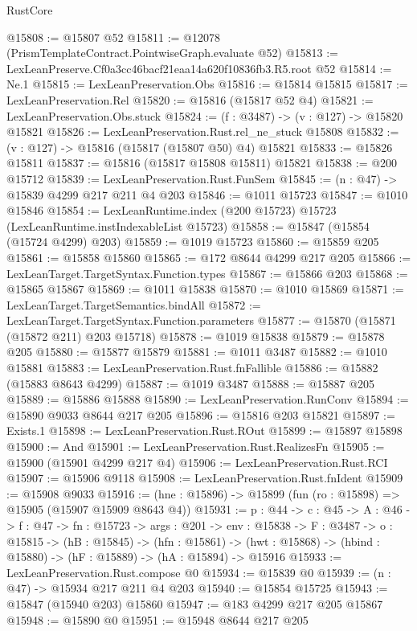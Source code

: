\begin{lexlean}{RustCore}
\begin{coremodule}
@15808 := @15807 @52
@15811 := @12078 (PrismTemplateContract.PointwiseGraph.evaluate @52)
@15813 := LexLeanPreserve.Cf0a3cc46bacf21eaa14a620f10836fb3.R5.root @52
@15814 := Ne.{1}
@15815 := LexLeanPreservation.Obs
@15816 := @15814 @15815
@15817 := LexLeanPreservation.Rel
@15820 := @15816 (@15817 @52 @4)
@15821 := LexLeanPreservation.Obs.stuck
@15824 := (f : @3487) -> (v : @127) -> @15820 @15821
@15826 := LexLeanPreservation.Rust.rel_ne_stuck @15808
@15832 := (v : @127) -> @15816 (@15817 (@15807 @50) @4) @15821
@15833 := @15826 @15811
@15837 := @15816 (@15817 @15808 @15811) @15821
@15838 := @200 @15712
@15839 := LexLeanPreservation.Rust.FunSem
@15845 := (n : @47) -> @15839 @4299 @217 @211 @4 @203
@15846 := @1011 @15723
@15847 := @1010 @15846
@15854 := LexLeanRuntime.index (@200 @15723) @15723 (LexLeanRuntime.instIndexableList @15723)
@15858 := @15847 (@15854 (@15724 @4299) @203)
@15859 := @1019 @15723
@15860 := @15859 @205
@15861 := @15858 @15860
@15865 := @172 @8644 @4299 @217 @205
@15866 := LexLeanTarget.TargetSyntax.Function.types
@15867 := @15866 @203
@15868 := @15865 @15867
@15869 := @1011 @15838
@15870 := @1010 @15869
@15871 := LexLeanTarget.TargetSemantics.bindAll
@15872 := LexLeanTarget.TargetSyntax.Function.parameters
@15877 := @15870 (@15871 (@15872 @211) @203 @15718)
@15878 := @1019 @15838
@15879 := @15878 @205
@15880 := @15877 @15879
@15881 := @1011 @3487
@15882 := @1010 @15881
@15883 := LexLeanPreservation.Rust.fnFallible
@15886 := @15882 (@15883 @8643 @4299)
@15887 := @1019 @3487
@15888 := @15887 @205
@15889 := @15886 @15888
@15890 := LexLeanPreservation.RunConv
@15894 := @15890 @9033 @8644 @217 @205
@15896 := @15816 @203 @15821
@15897 := Exists.{1}
@15898 := LexLeanPreservation.Rust.ROut
@15899 := @15897 @15898
@15900 := And
@15901 := LexLeanPreservation.Rust.RealizesFn
@15905 := @15900 (@15901 @4299 @217 @4)
@15906 := LexLeanPreservation.Rust.RCI
@15907 := @15906 @9118
@15908 := LexLeanPreservation.Rust.fnIdent
@15909 := @15908 @9033
@15916 := (hne : @15896) -> @15899 (fun (ro : @15898) => @15905 (@15907 @15909 @8643 @4))
@15931 := {p : @44} ->
  {c : @45} ->
  {A : @46} ->
  {f : @47} ->
  {fn : @15723} ->
  {args : @201} ->
  {env : @15838} ->
  {F : @3487} ->
  {o : @15815} ->
  (hB : @15845) ->
  (hfn : @15861) -> (hwt : @15868) -> (hbind : @15880) -> (hF : @15889) -> (hA : @15894) -> @15916
@15933 := LexLeanPreservation.Rust.compose @0
@15934 := @15839 @0
@15939 := (n : @47) -> @15934 @217 @211 @4 @203
@15940 := @15854 @15725
@15943 := @15847 (@15940 @203) @15860
@15947 := @183 @4299 @217 @205 @15867
@15948 := @15890 @0
@15951 := @15948 @8644 @217 @205

\end{coremodule}
\end{lexlean}
